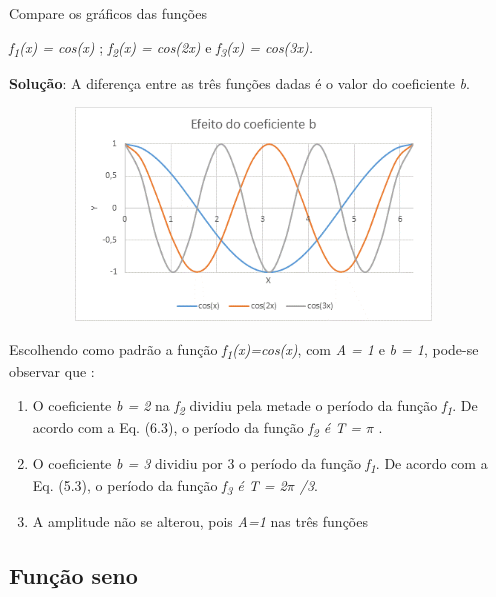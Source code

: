 \begin{texemplo}
Compare os gráficos das funções

\textit{f\textsubscript{1}(x) = cos(x)} ; \tab  \textit{f\textsubscript{2}(x) = cos(2x)} \tab e \tab \textit{f\textsubscript{3}(x) = cos(3x).}

\textbf{Solução}: A diferença entre as três funções dadas é o valor do coeficiente \textit{b}.

\begin{figure}[H]
    \begin{Center}
        \includegraphics[width=4.26in,height=2.23in]{capitulos/trigonometria_e_funcoes_trigonometricas/media/image33.png}
    \end{Center}
\end{figure}

Escolhendo como padrão a função  \textit{f\textsubscript{1}(x)=cos(x)}, com \textit{A = 1}  e \textit{b = 1}, pode-se observar que :

\begin{enumerate}
    \item O coeficiente \textit{b = 2} na \textit{f\textsubscript{2} }dividiu pela metade o período da função \textit{f\textsubscript{1}}. De acordo com a Eq. (6.3), o período da função \textit{f\textsubscript{2} é T = $ \pi $ }.

    \item O coeficiente \textit{b = 3} dividiu por 3 o período da função \textit{f\textsubscript{1}}. De acordo com a Eq. (5.3), o período da função \textit{f\textsubscript{3} é T = 2$ \pi $ /3}.

    \item  A amplitude não se alterou, pois  \textit{A=1 } nas três funções \qedsymbol
\end{enumerate}
\end{texemplo}

\subsection{Função seno}

